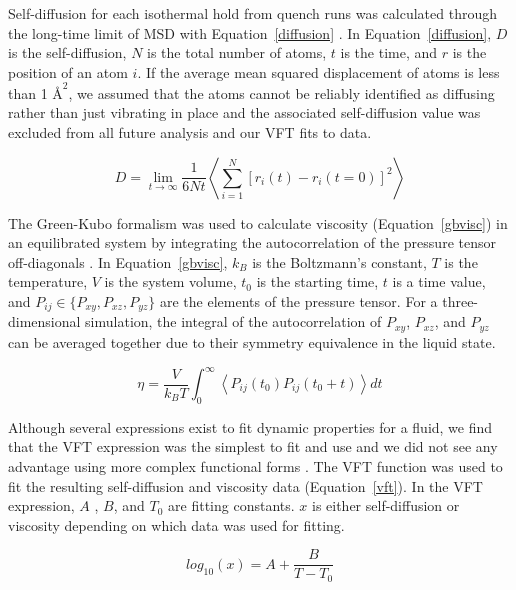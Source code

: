 \documentclass[11pt,a4paper]{article}                                %
\begin{document}
\par
Self-diffusion for each isothermal hold from quench runs was calculated through the long-time limit of MSD with Equation~\ref{diffusion} \cite{Rapaport}. In Equation~\ref{diffusion}, $D$ is the self-diffusion, $N$ is the total number of atoms, $t$ is the time, and $r$ is the position of an atom $i$. If the average mean squared displacement of atoms is less than 1 $\text{\AA}^{2}$, we assumed that the atoms cannot be reliably identified as diffusing rather than just vibrating in place and the associated self-diffusion value was excluded from all future analysis and our VFT fits to data.

\begin{equation}\label{diffusion}
    D=\lim_{t \to \infty} \frac{1}{6Nt} \left < \sum_{i=1}^{N} \left [ r_{i}(t)-r_{i}(t=0) \right ]^{2} \right >
\end{equation}

\par
The Green-Kubo formalism was used to calculate viscosity (Equation~\ref{gbvisc}) in an equilibrated system by integrating the autocorrelation of the pressure tensor off-diagonals \cite{Rapaport, Puosi2018, Hess2002, Zwanzig1964}. In Equation~\ref{gbvisc}, $k_{B}$ is the Boltzmann's constant, $T$ is the temperature, $V$ is the system volume, $t_{0}$ is the starting time, $t$ is a time value, and $P_{ij} \in \{P_{xy}, P_{xz}, P_{yz} \}$ are the elements of the pressure tensor. For a three-dimensional simulation, the integral of the autocorrelation of $P_{xy}$, $P_{xz}$, and $P_{yz}$ can be averaged together due to their symmetry equivalence in the liquid state.

\begin{equation}\label{gbvisc}
    \eta = \frac{V}{k_{B}T} \int_{0}^{\infty} \left < P_{ij}(t_{0})P_{ij}(t_{0}+t)\right >dt 
\end{equation}

\par
Although several expressions exist to fit dynamic properties for a fluid, we find that the VFT expression was the simplest to fit and use and we did not see any advantage using more complex functional forms \cite{Blodgett2015}. The VFT function was used to fit the resulting self-diffusion and viscosity data (Equation~\ref{vft}). In the VFT expression, $A$ , $B$, and $T_{0}$ are fitting constants. $x$ is either self-diffusion or viscosity depending on which data was used for fitting.

\begin{equation}\label{vft}
    log_{10}(x)=A+\frac{B}{T-T_{0}}
\end{equation}
\end{document}
